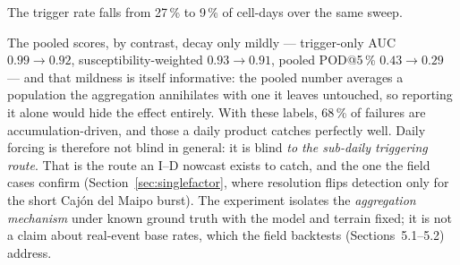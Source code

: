 \documentclass[authoryear,preprint,review,12pt]{elsarticle}
\begin{document}
\begin{table}[ht]
\centering
\small
\caption{One-at-a-time sweep of the controlled experiment (five realisations per row): POD at a 5\,\% alerted-area budget on burst-driven failures at half-hourly and daily resolution, the coarsest resolution at which it is still at least half its half-hourly value, and POD on accumulation-driven failures. ``Ceiling'' is the daily total at which a burst spread over 24\,h reaches the curve, $a\cdot24^{1-b}$.}
\label{tab:sweep}

\end{table}
The trigger rate falls from 27\,\% to 9\,\% of cell-days over the same sweep.

The pooled scores, by contrast, decay only mildly --- trigger-only AUC
$0.99\to0.92$, susceptibility-weighted $0.93\to0.91$, pooled POD@5\,\%
$0.43\to0.29$ --- and that mildness is itself informative: the pooled number
averages a population the aggregation annihilates with one it leaves untouched, so
reporting it alone would hide the effect entirely. With these labels, 68\,\% of
failures are accumulation-driven, and those a daily product catches perfectly well.
Daily forcing is therefore not blind in general: it is blind \emph{to the sub-daily triggering route}. That is the route an I--D nowcast exists to catch, and the one the field cases confirm
(Section~\ref{sec:singlefactor}, where resolution flips detection only for the
short Caj\'on del Maipo burst). The experiment isolates the \emph{aggregation
mechanism} under known ground truth with the model and terrain fixed; it is not a
claim about real-event base rates, which the field backtests (Sections~5.1--5.2)
address.
\end{document}
